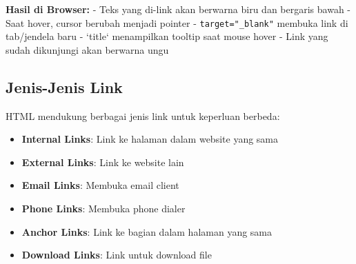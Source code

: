 \textbf{Hasil di Browser:}
- Teks yang di-link akan berwarna biru dan bergaris bawah
- Saat hover, cursor berubah menjadi pointer
- \texttt{target="\_blank"} membuka link di tab/jendela baru
- `title` menampilkan tooltip saat mouse hover
- Link yang sudah dikunjungi akan berwarna ungu

\subsection{Jenis-Jenis Link}

HTML mendukung berbagai jenis link untuk keperluan berbeda:

\begin{itemize}
  \item \textbf{Internal Links}: Link ke halaman dalam website yang sama
  \item \textbf{External Links}: Link ke website lain
  \item \textbf{Email Links}: Membuka email client
  \item \textbf{Phone Links}: Membuka phone dialer
  \item \textbf{Anchor Links}: Link ke bagian dalam halaman yang sama
  \item \textbf{Download Links}: Link untuk download file
\end{itemize}

